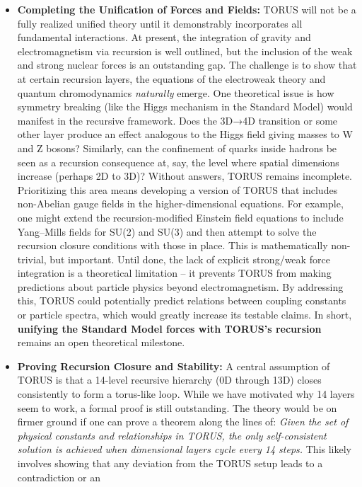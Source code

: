 \begin{itemize}
\item
  \textbf{Completing the Unification of Forces and Fields:} TORUS will
  not be a fully realized unified theory until it demonstrably
  incorporates all fundamental interactions. At present, the integration
  of gravity and electromagnetism via recursion is well outlined, but
  the inclusion of the weak and strong nuclear forces is an outstanding
  gap​. The challenge is to show that at certain recursion layers, the
  equations of the electroweak theory and quantum chromodynamics
  \emph{naturally} emerge. One theoretical issue is how symmetry
  breaking (like the Higgs mechanism in the Standard Model) would
  manifest in the recursive framework. Does the 3D→4D transition or some
  other layer produce an effect analogous to the Higgs field giving
  masses to W and Z bosons? Similarly, can the confinement of quarks
  inside hadrons be seen as a recursion consequence at, say, the level
  where spatial dimensions increase (perhaps 2D to 3D)? Without answers,
  TORUS remains incomplete. Prioritizing this area means developing a
  version of TORUS that includes non-Abelian gauge fields in the
  higher-dimensional equations. For example, one might extend the
  recursion-modified Einstein field equations to include Yang--Mills
  fields for SU(2) and SU(3) and then attempt to solve the recursion
  closure conditions with those in place. This is mathematically
  non-trivial, but important. Until done, the lack of explicit
  strong/weak force integration is a theoretical limitation -- it
  prevents TORUS from making predictions about particle physics beyond
  electromagnetism. By addressing this, TORUS could potentially predict
  relations between coupling constants or particle spectra, which would
  greatly increase its testable claims. In short, \textbf{unifying the
  Standard Model forces with TORUS's recursion} remains an open
  theoretical milestone.
\item
  \textbf{Proving Recursion Closure and Stability:} A central assumption
  of TORUS is that a 14-level recursive hierarchy (0D through 13D)
  closes consistently to form a torus-like loop. While we have motivated
  why 14 layers seem to work, a formal proof is still outstanding. The
  theory would be on firmer ground if one can prove a theorem along the
  lines of: \emph{Given the set of physical constants and relationships
  in TORUS, the only self-consistent solution is achieved when
  dimensional layers cycle every 14 steps.} This likely involves showing
  that any deviation from the TORUS setup leads to a contradiction or an

\end{itemize}
